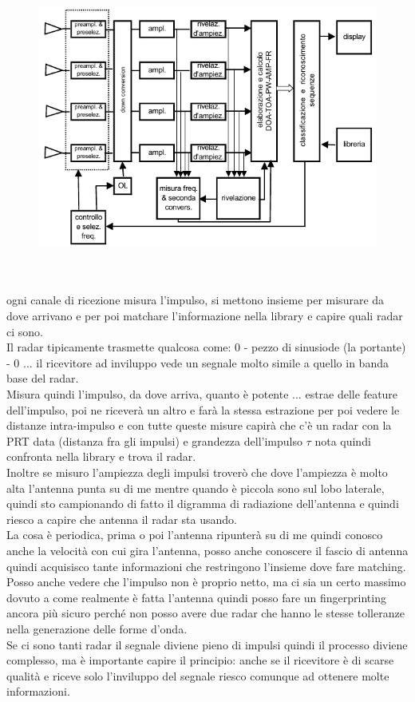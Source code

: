 \documentclass[oneside, 12pt]{extbook}
\begin{document}
\begin{figure}[!h]
	\includegraphics[scale=0.5]{immagini/localization/esm-multi.png}
\end{figure}\\\\
ogni canale di ricezione misura l'impulso, si mettono insieme per misurare da dove arrivano e per poi matchare l'informazione nella library e capire quali radar ci sono.\\
Il radar tipicamente trasmette qualcosa come: 0 - pezzo di sinusiode (la portante) - 0 ... il ricevitore ad inviluppo vede un segnale molto simile a quello in banda base del radar.\\
Misura quindi l'impulso, da dove arriva, quanto è potente ... estrae delle feature dell'impulso, poi ne riceverà un altro e farà la stessa estrazione per poi vedere le distanze intra-impulso e con tutte queste misure capirà che c'è un radar con la PRT data (distanza fra gli impulsi) e grandezza dell'impulso $\tau$ nota quindi confronta nella library e trova il radar.\\
Inoltre se misuro l'ampiezza degli impulsi troverò che dove l'ampiezza è molto alta l'antenna punta su di me mentre quando è piccola sono sul lobo laterale, quindi sto campionando di fatto il digramma di radiazione dell'antenna e quindi riesco a capire che antenna il radar sta usando.\\
La cosa è periodica, prima o poi l'antenna ripunterà su di me quindi conosco anche la velocità con cui gira l'antenna, posso anche conoscere il fascio di antenna quindi acquisisco tante informazioni che restringono l'insieme dove fare matching.\\
Posso anche vedere che l'impulso non è proprio netto, ma ci sia un certo massimo dovuto a come realmente è fatta l'antenna quindi posso fare un fingerprinting ancora più sicuro perché non posso avere due radar che hanno le stesse tolleranze nella generazione delle forme d'onda.\\
Se ci sono tanti radar il segnale diviene pieno di impulsi quindi il processo diviene complesso, ma è importante capire il principio: anche se il ricevitore è di scarse qualità e riceve solo l'inviluppo del segnale riesco comunque ad ottenere molte informazioni.
\end{document}
